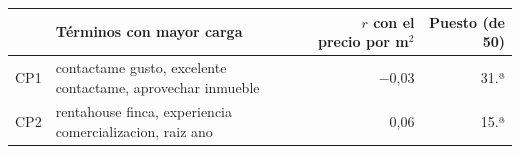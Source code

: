 \begin{tabular}{l l r r}
\toprule
& Términos con mayor carga & $r$ con el precio por m$^2$ & Puesto (de 50) \\
\midrule
CP1 & contactame gusto, excelente contactame, aprovechar inmueble & $-$0,03 & 31.ª \\
CP2 & rentahouse finca, experiencia comercializacion, raiz ano & 0,06 & 15.ª \\
\bottomrule
\end{tabular}

